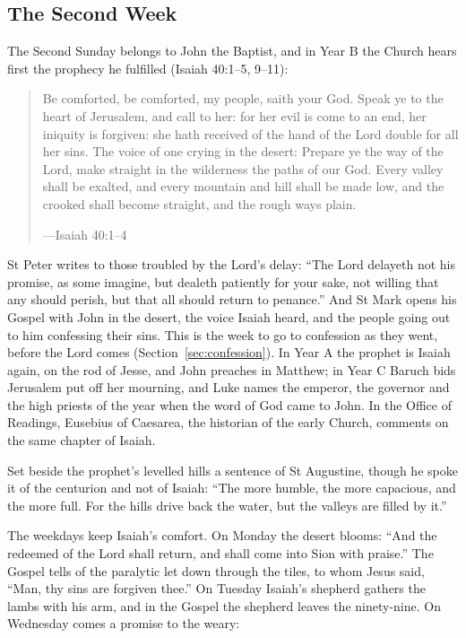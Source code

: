 \subsection{The Second Week}\label{sec:week2}

The Second Sunday belongs to John the Baptist, and in Year B the Church hears
first the prophecy he fulfilled (Isaiah 40:1--5, 9--11):

\begin{quote}
Be comforted, be comforted, my people, saith your God. Speak ye to the heart of
Jerusalem, and call to her: for her evil is come to an end, her iniquity is
forgiven: she hath received of the hand of the Lord double for all her sins. The
voice of one crying in the desert: Prepare ye the way of the Lord, make straight
in the wilderness the paths of our God. Every valley shall be exalted, and every
mountain and hill shall be made low, and the crooked shall become straight, and
the rough ways plain.\par
{\smallskip\noindent\small ---Isaiah 40:1--4\par}
\end{quote}

\noindent St Peter writes to those troubled by the Lord's delay: ``The Lord delayeth
not his promise, as some imagine, but dealeth patiently for your sake, not
willing that any should perish, but that all should return to penance.'' And St
Mark opens his Gospel with John in the desert, the voice Isaiah heard, and the
people going out to him confessing their sins. This is the week to go to
confession as they went, before the Lord comes (Section~\ref{sec:confession}). In Year A the prophet is Isaiah again, on the
rod of Jesse, and John preaches in Matthew; in Year C Baruch bids Jerusalem put
off her mourning, and Luke names the emperor, the governor and the high priests
of the year when the word of God came to John. In the Office of Readings,
Eusebius of Caesarea, the historian of the early Church, comments on the same
chapter of Isaiah.

Set beside the prophet's levelled hills a sentence of St Augustine, though he
spoke it of the centurion and not of Isaiah: ``The more humble, the more capacious, and the more
full. For the hills drive back the water, but the valleys are filled by it.''

The weekdays keep Isaiah's comfort. On Monday the desert blooms: ``And the
redeemed of the Lord shall return, and shall come into Sion with praise.'' The
Gospel tells of the paralytic let down through the tiles, to whom Jesus said,
``Man, thy sins are forgiven thee.'' On Tuesday Isaiah's shepherd gathers the
lambs with his arm, and in the Gospel the shepherd leaves the ninety-nine. On
Wednesday comes a promise to the weary:

